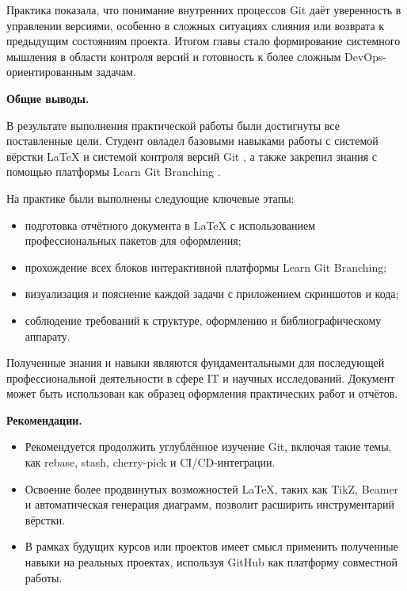 \documentclass[a4paper,12pt]{report}
\begin{document}
Практика показала, что понимание внутренних процессов Git даёт уверенность в управлении версиями, особенно в сложных ситуациях слияния или возврата к предыдущим состояниям проекта. Итогом главы стало формирование системного мышления в области контроля версий и готовность к более сложным DevOps-ориентированным задачам.





\textbf{Общие выводы.}

В результате выполнения практической работы были достигнуты все поставленные цели. Студент овладел базовыми навыками работы с системой вёрстки \LaTeX{} и системой контроля версий Git \cite{latex_official_doc, progit_book}, а также закрепил знания с помощью платформы Learn Git Branching \cite{learngitbranching}.

На практике были выполнены следующие ключевые этапы:
\begin{itemize}
  \item подготовка отчётного документа в \LaTeX{} с использованием профессиональных пакетов для оформления;
  \item прохождение всех блоков интерактивной платформы Learn Git Branching;
  \item визуализация и пояснение каждой задачи с приложением скриншотов и кода;
  \item соблюдение требований к структуре, оформлению и библиографическому аппарату.
\end{itemize}

Полученные знания и навыки являются фундаментальными для последующей профессиональной деятельности в сфере IT и научных исследований. Документ может быть использован как образец оформления практических работ и отчётов.

\textbf{Рекомендации.}

\begin{itemize}
  \item Рекомендуется продолжить углублённое изучение Git, включая такие темы, как rebase, stash, cherry-pick и CI/CD-интеграции.
  \item Освоение более продвинутых возможностей \LaTeX{}, таких как TikZ, Beamer и автоматическая генерация диаграмм, позволит расширить инструментарий вёрстки.
  \item В рамках будущих курсов или проектов имеет смысл применить полученные навыки на реальных проектах, используя GitHub как платформу совместной работы.
\end{itemize}
\end{document}
